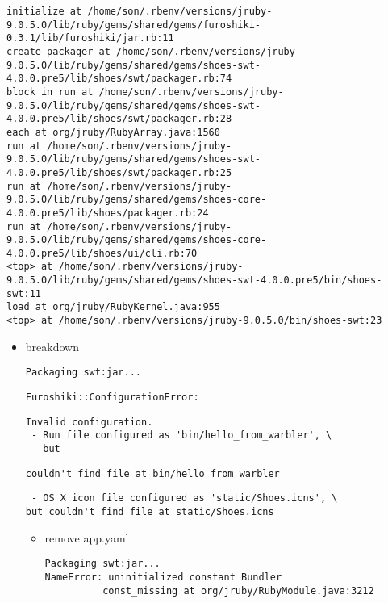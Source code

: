 \documentclass[11pt]{article}
\begin{document}
\begin{itemize}
\begin{verbatim}
initialize at /home/son/.rbenv/versions/jruby-9.0.5.0/lib/ruby/gems/shared/gems/furoshiki-0.3.1/lib/furoshiki/jar.rb:11
create_packager at /home/son/.rbenv/versions/jruby-9.0.5.0/lib/ruby/gems/shared/gems/shoes-swt-4.0.0.pre5/lib/shoes/swt/packager.rb:74
block in run at /home/son/.rbenv/versions/jruby-9.0.5.0/lib/ruby/gems/shared/gems/shoes-swt-4.0.0.pre5/lib/shoes/swt/packager.rb:28
each at org/jruby/RubyArray.java:1560
run at /home/son/.rbenv/versions/jruby-9.0.5.0/lib/ruby/gems/shared/gems/shoes-swt-4.0.0.pre5/lib/shoes/swt/packager.rb:25
run at /home/son/.rbenv/versions/jruby-9.0.5.0/lib/ruby/gems/shared/gems/shoes-core-4.0.0.pre5/lib/shoes/packager.rb:24
run at /home/son/.rbenv/versions/jruby-9.0.5.0/lib/ruby/gems/shared/gems/shoes-core-4.0.0.pre5/lib/shoes/ui/cli.rb:70
<top> at /home/son/.rbenv/versions/jruby-9.0.5.0/lib/ruby/gems/shared/gems/shoes-swt-4.0.0.pre5/bin/shoes-swt:11
load at org/jruby/RubyKernel.java:955
<top> at /home/son/.rbenv/versions/jruby-9.0.5.0/bin/shoes-swt:23
\end{verbatim}

\begin{itemize}
\item breakdown

\begin{verbatim}
Packaging swt:jar...
\end{verbatim}

\begin{verbatim}
Furoshiki::ConfigurationError: 
\end{verbatim}

\begin{verbatim}
Invalid configuration.
 - Run file configured as 'bin/hello_from_warbler', \
   but 
\end{verbatim}

\begin{verbatim}
couldn't find file at bin/hello_from_warbler
\end{verbatim}

\begin{verbatim}
 - OS X icon file configured as 'static/Shoes.icns', \
but couldn't find file at static/Shoes.icns
\end{verbatim}

\begin{itemize}
\item remove app.yaml

\begin{verbatim}
Packaging swt:jar...
NameError: uninitialized constant Bundler
          const_missing at org/jruby/RubyModule.java:3212
\end{verbatim}


\end{itemize}
\end{itemize}
\end{itemize}
\end{document}
